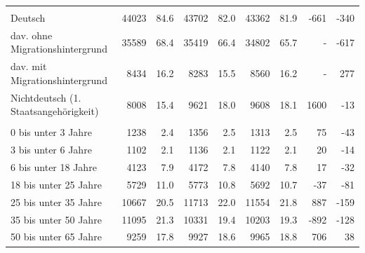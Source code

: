 \documentclass[
  a4paper,
  twoside]{article}
\begin{document}
\begin{table}[!h]
{\begin{threeparttable}
\begin{tabular}[t]{lrrrrrrrr}
\addlinespace[0.3em]
\multicolumn{9}{l}{\textcolor[HTML]{044891}{Bevölkerung nach Migrationshintergrund}}\\
\hspace{1em}\hspace{1em}Deutsch & 44023 & 84.6 & 43702 & 82.0 & 43362 & 81.9 & -661 & -340\\
\hspace{1em}\hspace{2em}dav. ohne Migrationshintergrund & 35589 & 68.4 & 35419 & 66.4 & 34802 & 65.7 & - & -617\\
\hspace{1em}\hspace{2em}dav. mit Migrationshintergrund & 8434 & 16.2 & 8283 & 15.5 & 8560 & 16.2 & - & 277\\
\hspace{1em}\hspace{1em}Nichtdeutsch (1. Staatsangehörigkeit) & 8008 & 15.4 & 9621 & 18.0 & 9608 & 18.1 & 1600 & -13\\
\addlinespace[0.3em]
\multicolumn{9}{l}{\textcolor[HTML]{044891}{Bevölkerung nach Altersgruppen}}\\
\hspace{1em}\hspace{1em}0 bis unter 3 Jahre & 1238 & 2.4 & 1356 & 2.5 & 1313 & 2.5 & 75 & -43\\
\hspace{1em}\hspace{1em}3 bis unter 6 Jahre & 1102 & 2.1 & 1136 & 2.1 & 1122 & 2.1 & 20 & -14\\
\hspace{1em}\hspace{1em}6 bis unter 18 Jahre & 4123 & 7.9 & 4172 & 7.8 & 4140 & 7.8 & 17 & -32\\
\hspace{1em}\hspace{1em}18 bis unter 25 Jahre & 5729 & 11.0 & 5773 & 10.8 & 5692 & 10.7 & -37 & -81\\
\hspace{1em}\hspace{1em}25 bis unter 35 Jahre & 10667 & 20.5 & 11713 & 22.0 & 11554 & 21.8 & 887 & -159\\
\hspace{1em}\hspace{1em}35 bis unter 50 Jahre & 11095 & 21.3 & 10331 & 19.4 & 10203 & 19.3 & -892 & -128\\
\hspace{1em}\hspace{1em}50 bis unter 65 Jahre & 9259 & 17.8 & 9927 & 18.6 & 9965 & 18.8 & 706 & 38\\

\end{tabular}
\end{threeparttable}}
\end{table}
\end{document}
